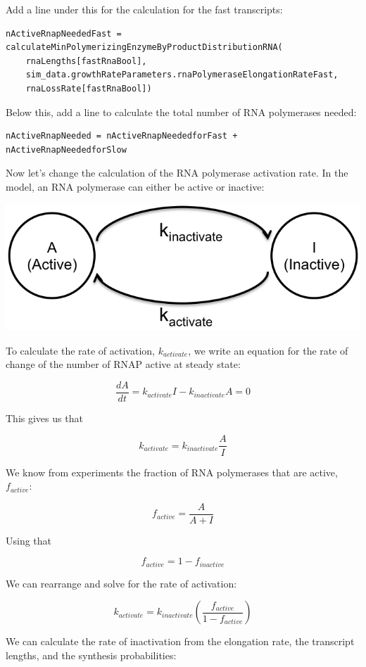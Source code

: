 \documentclass[12pt]{article}
\begin{document}
Add a line under this for the calculation for the fast transcripts:

\begin{lstlisting}
nActiveRnapNeededFast = calculateMinPolymerizingEnzymeByProductDistributionRNA(
    rnaLengths[fastRnaBool], 
    sim_data.growthRateParameters.rnaPolymeraseElongationRateFast, 
    rnaLossRate[fastRnaBool])
\end{lstlisting}

Below this, add a line to calculate the total number of RNA polymerases needed:

\begin{lstlisting}
nActiveRnapNeeded = nActiveRnapNeededforFast + nActiveRnapNeededforSlow
\end{lstlisting}

Now let’s change the calculation of the RNA polymerase activation rate. In the model, an RNA polymerase can either be active or inactive:

\includegraphics{img.png}


To calculate the rate of activation, $k_{activate}$, we write an equation for the rate of change of the number of RNAP active at steady state:

$$
\frac{dA}{dt}=k_{activate}I - k_{inactivate}A=0
$$

This gives us that

$$
k_{activate} = k_{inactivate}\frac{A}{I}
$$


We know from experiments the fraction of RNA polymerases that are active, $f_{active}$:

$$
f_{active}=\frac{A}{A+I}
$$

Using that 

$$
f_{active} = 1 - f_{inactive}
$$

We can rearrange and solve for the rate of activation:

$$
k_{activate}=k_{inactivate}\left(\frac{f_{active}}{1-f_{active}} \right)
$$

We can calculate the rate of inactivation from the elongation rate, the transcript lengths, and the synthesis probabilities:
\end{document}
